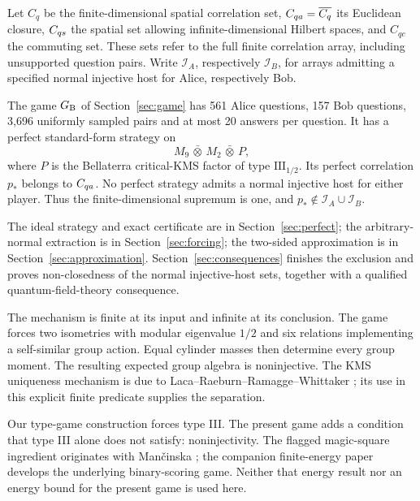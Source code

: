 Let $C_q$ be the finite-dimensional spatial correlation set, $C_{qa}=\overline{C_q}$ its Euclidean closure, $C_{qs}$ the spatial set allowing infinite-dimensional Hilbert spaces, and $C_{qc}$ the commuting set. These sets refer to the full finite correlation array, including unsupported question pairs. Write $\mathcal I_A$, respectively $\mathcal I_B$, for arrays admitting a specified normal injective host for Alice, respectively Bob.

\begin{theorem}\label{thm:main}
The game $G_{\mathrm B}$ of Section~\ref{sec:game} has 561 Alice questions, 157 Bob questions, 3,696 uniformly sampled pairs and at most 20 answers per question. It has a perfect standard-form strategy on
\[
 M_9\,\bar\otimes\,M_2\,\bar\otimes\,P,
\]
where $P$ is the Bellaterra critical-KMS factor of type $\mathrm{III}_{1/2}$. Its perfect correlation $p_*$ belongs to $C_{qa}$. No perfect strategy admits a normal injective host for either player. Thus the finite-dimensional supremum is one, and $p_*\notin\mathcal I_A\cup\mathcal I_B$.
\end{theorem}
The ideal strategy and exact certificate are in Section~\ref{sec:perfect}; the arbitrary-normal extraction is in Section~\ref{sec:forcing}; the two-sided approximation is in Section~\ref{sec:approximation}. Section~\ref{sec:consequences} finishes the exclusion and proves non-closedness of the normal injective-host sets, together with a qualified quantum-field-theory consequence.

The mechanism is finite at its input and infinite at its conclusion. The game forces two isometries with modular eigenvalue $1/2$ and six relations implementing a self-similar group action. Equal cylinder masses then determine every group moment. The resulting expected group algebra is noninjective. The KMS uniqueness mechanism is due to Laca--Raeburn--Ramagge--Whittaker \cite{LRRW}; its use in this explicit finite predicate supplies the separation.

Our type-game construction \cite{TypeGames} forces type III. The present game adds a condition that type III alone does not satisfy: noninjectivity. The flagged magic-square ingredient originates with Man\v cinska \cite{FMS}; the companion finite-energy paper \cite{Base} develops the underlying binary-scoring game. Neither that energy result nor an energy bound for the present game is used here.


